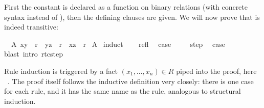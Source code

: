 \begin{isabellebody}
\begin{isamarkuptext}
\noindent
First the constant is declared as a function on binary
relations (with concrete syntax  instead of ), then the defining clauses are given. We will now prove that
 is indeed transitive:%
\end{isamarkuptext}%
\isamarkuptrue%
\ \ A{\isacharcolon}\ {\isachardoublequote}{\isacharparenleft}x{\isacharcomma}y{\isacharparenright}\ {\isasymin}\ r{\isacharasterisk}{\isachardoublequote}\ \ {\isachardoublequote}{\isacharparenleft}y{\isacharcomma}z{\isacharparenright}\ {\isasymin}\ r{\isacharasterisk}\ {\isasymLongrightarrow}\ {\isacharparenleft}x{\isacharcomma}z{\isacharparenright}\ {\isasymin}\ r{\isacharasterisk}{\isachardoublequote}\isanewline
\isamarkupfalse%
\ A\isanewline
\isamarkupfalse%
\ induct\isanewline
\ \ \isamarkupfalse%
\ refl\ \isamarkupfalse%
\ {\isacharquery}case\ \isamarkupfalse%
\isacommand{{\isachardot}}\isanewline
\isamarkupfalse%
\isanewline
\ \ \isamarkupfalse%
\ step\ \isamarkupfalse%
\ {\isacharquery}case\ \isamarkupfalse%
blast\ intro{\isacharcolon}\ rtc{\isachardot}step{\isacharparenright}\isanewline
\isamarkupfalse%
\isamarkupfalse%
%
\begin{isamarkuptext}%
\noindent Rule induction is triggered by a fact $(x_1,\dots,x_n)
\in R$ piped into the proof, here ~. The
proof itself follows the inductive definition very
closely: there is one case for each rule, and it has the same name as
the rule, analogous to structural induction.


\end{isamarkuptext}
\end{isabellebody}
